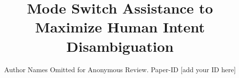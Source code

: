 \documentclass[conference]{IEEEtran}
\begin{document}
\title{Mode Switch Assistance to\\Maximize Human Intent Disambiguation}
\author{Author Names Omitted for Anonymous Review. Paper-ID [add your ID here]}




% 
%
%
%
%


\maketitle
\end{document}
